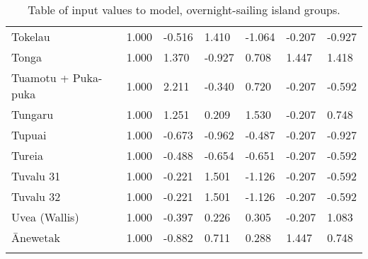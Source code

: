 \begin{longtable}{p{4.5cm}p{1.7cm}p{1.7cm}p{1.7cm}p{1.7cm}p{1.7cm}p{1.7cm}}
  Tokelau & 1.000 & -0.516 & 1.410 & -1.064 & -0.207 & -0.927 \\ 
  Tonga & 1.000 & 1.370 & -0.927 & 0.708 & 1.447 & 1.418 \\ 
  Tuamotu + Puka-puka & 1.000 & 2.211 & -0.340 & 0.720 & -0.207 & -0.592 \\ 
  Tungaru & 1.000 & 1.251 & 0.209 & 1.530 & -0.207 & 0.748 \\ 
  Tupuai & 1.000 & -0.673 & -0.962 & -0.487 & -0.207 & -0.927 \\ 
  Tureia & 1.000 & -0.488 & -0.654 & -0.651 & -0.207 & -0.592 \\ 
  Tuvalu 31 & 1.000 & -0.221 & 1.501 & -1.126 & -0.207 & -0.592 \\ 
  Tuvalu 32 & 1.000 & -0.221 & 1.501 & -1.126 & -0.207 & -0.592 \\ 
  Uvea (Wallis) & 1.000 & -0.397 & 0.226 & 0.305 & -0.207 & 1.083 \\ 
  Ānewetak & 1.000 & -0.882 & 0.711 & 0.288 & 1.447 & 0.748 \\ 
   \bottomrule
\caption{Table of input values to model, overnight-sailing island groups.} 
\label{appendix_SBZR_table}
\end{longtable}
